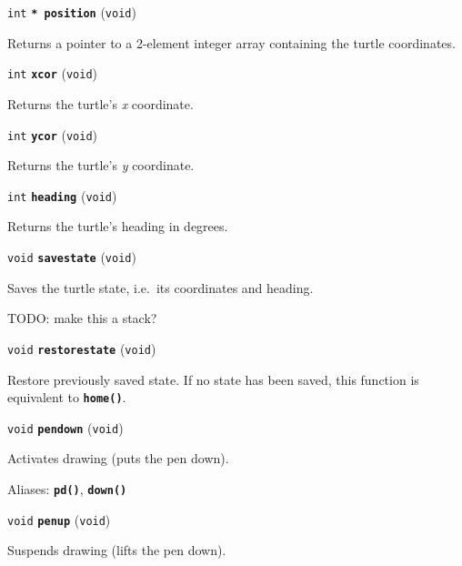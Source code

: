 \documentclass[a4paper,11pt]{article}
\newcommand{\V}{\texttt{void}}      %
\newcommand{\I}{\texttt{int}}       %
\newcommand{\func}[1]{\textbf{\texttt{#1}}}  %
\newcommand{\A}[1]{\emph{#1}}       %
\newenvironment{bgi}
{ %
  \begin{snugshade}
}
{ %
  \end{snugshade}
}
\begin{document}
\begin{bgi}
\I{} \func{* position} (\V{})
\end{bgi}

Returns a pointer to a 2-element integer array containing the turtle
coordinates.


\begin{bgi}
\I{} \func{xcor} (\V{})
\end{bgi}

Returns the turtle's \A{x} coordinate.


\begin{bgi}
\I{} \func{ycor} (\V{})
\end{bgi}

Returns the turtle's \A{y} coordinate.


\begin{bgi}
\I{} \func{heading} (\V{})
\end{bgi}

Returns the turtle's heading in degrees.


\begin{bgi}
\V{} \func{savestate} (\V{})
\end{bgi}

Saves the turtle state, i.e.\ its coordinates and heading.

TODO: make this a stack?


\begin{bgi}
\V{} \func{restorestate} (\V{})
\end{bgi}

Restore previously saved state. If no state has been saved, this
function is equivalent to \func{home()}.


\begin{bgi}
\V{} \func{pendown} (\V{})
\end{bgi}

Activates drawing (puts the pen down).

Aliases: \func{pd()}, \func{down()}


\begin{bgi}
\V{} \func{penup} (\V{})
\end{bgi}

Suspends drawing (lifts the pen down).
\end{document}
